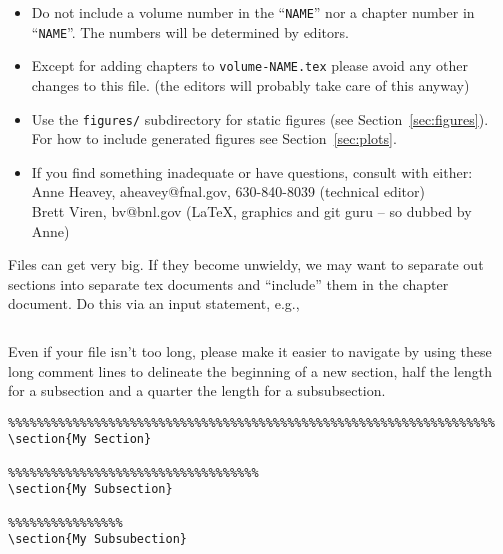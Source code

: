 \begin{itemize}
\item Do not include a volume number in the ``\texttt{NAME}'' nor a chapter number in ``\texttt{NAME}''.  The numbers will be determined by editors. 
\item Except for adding chapters to \texttt{volume-NAME.tex} please avoid any other changes to this file.   (the editors will probably take care of this anyway)
\item Use the \texttt{figures/} subdirectory for static figures (see Section~\ref{sec:figures}). For how to include generated figures see Section~\ref{sec:plots}.
\item If you find something inadequate or have questions, consult with either: \\
Anne Heavey, aheavey@fnal.gov, 630-840-8039 (technical editor)\\
Brett Viren, bv@bnl.gov (\LaTeX{}, graphics and git guru  -- so dubbed by Anne)
\end{itemize}

Files can get very big.  If they become unwieldy, we may want to separate out sections into 
separate tex documents and ``include'' them in the chapter document. Do this via an input 
statement, e.g.,
\begin{verbatim}

\end{verbatim}

Even if your file isn't too long, please make it easier to navigate by using these long comment lines
to delineate the beginning of a new section, half the length for a subsection and a quarter the
length for a subsubsection.  

\begin{verbatim}
%%%%%%%%%%%%%%%%%%%%%%%%%%%%%%%%%%%%%%%%%%%%%%%%%%%%%%%%%%%%%%%%%%%%
\section{My Section}

%%%%%%%%%%%%%%%%%%%%%%%%%%%%%%%%%%%
\section{My Subsection}

%%%%%%%%%%%%%%%%
\section{My Subsubection}
\end{verbatim}


